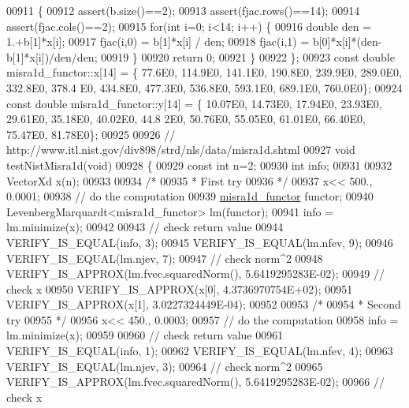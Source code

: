 \begin{DoxyCode}
00911     \{
00912         assert(b.size()==2);
00913         assert(fjac.rows()==14);
00914         assert(fjac.cols()==2);
00915         \textcolor{keywordflow}{for}(\textcolor{keywordtype}{int} i=0; i<14; i++) \{
00916             \textcolor{keywordtype}{double} den = 1.+b[1]*x[i];
00917             fjac(i,0) = b[1]*x[i] / den;
00918             fjac(i,1) = b[0]*x[i]*(den-b[1]*x[i])/den/den;
00919         \}
00920         \textcolor{keywordflow}{return} 0;
00921     \}
00922 \};
00923 \textcolor{keyword}{const} \textcolor{keywordtype}{double} misra1d\_functor::x[14] = \{ 77.6E0, 114.9E0, 141.1E0, 190.8E0, 239.9E0, 289.0E0, 332.8E0, 378.4
      E0, 434.8E0, 477.3E0, 536.8E0, 593.1E0, 689.1E0, 760.0E0\};
00924 \textcolor{keyword}{const} \textcolor{keywordtype}{double} misra1d\_functor::y[14] = \{ 10.07E0, 14.73E0, 17.94E0, 23.93E0, 29.61E0, 35.18E0, 40.02E0, 44.8
      2E0, 50.76E0, 55.05E0, 61.01E0, 66.40E0, 75.47E0, 81.78E0\};
00925 
00926 \textcolor{comment}{// http://www.itl.nist.gov/div898/strd/nls/data/misra1d.shtml}
00927 \textcolor{keywordtype}{void} testNistMisra1d(\textcolor{keywordtype}{void})
00928 \{
00929   \textcolor{keyword}{const} \textcolor{keywordtype}{int} n=2;
00930   \textcolor{keywordtype}{int} info;
00931 
00932   VectorXd x(n);
00933 
00934   \textcolor{comment}{/*}
00935 \textcolor{comment}{   * First try}
00936 \textcolor{comment}{   */}
00937   x<< 500., 0.0001;
00938   \textcolor{comment}{// do the computation}
00939   \hyperlink{structmisra1d__functor}{misra1d\_functor} functor;
00940   LevenbergMarquardt<misra1d\_functor> lm(functor);
00941   info = lm.minimize(x);
00942 
00943   \textcolor{comment}{// check return value}
00944   VERIFY\_IS\_EQUAL(info, 3);
00945   VERIFY\_IS\_EQUAL(lm.nfev, 9);
00946   VERIFY\_IS\_EQUAL(lm.njev, 7);
00947   \textcolor{comment}{// check norm^2}
00948   VERIFY\_IS\_APPROX(lm.fvec.squaredNorm(), 5.6419295283E-02);
00949   \textcolor{comment}{// check x}
00950   VERIFY\_IS\_APPROX(x[0], 4.3736970754E+02);
00951   VERIFY\_IS\_APPROX(x[1], 3.0227324449E-04);
00952 
00953   \textcolor{comment}{/*}
00954 \textcolor{comment}{   * Second try}
00955 \textcolor{comment}{   */}
00956   x<< 450., 0.0003;
00957   \textcolor{comment}{// do the computation}
00958   info = lm.minimize(x);
00959 
00960   \textcolor{comment}{// check return value}
00961   VERIFY\_IS\_EQUAL(info, 1);
00962   VERIFY\_IS\_EQUAL(lm.nfev, 4);
00963   VERIFY\_IS\_EQUAL(lm.njev, 3);
00964   \textcolor{comment}{// check norm^2}
00965   VERIFY\_IS\_APPROX(lm.fvec.squaredNorm(), 5.6419295283E-02);
00966   \textcolor{comment}{// check x}

\end{DoxyCode}
